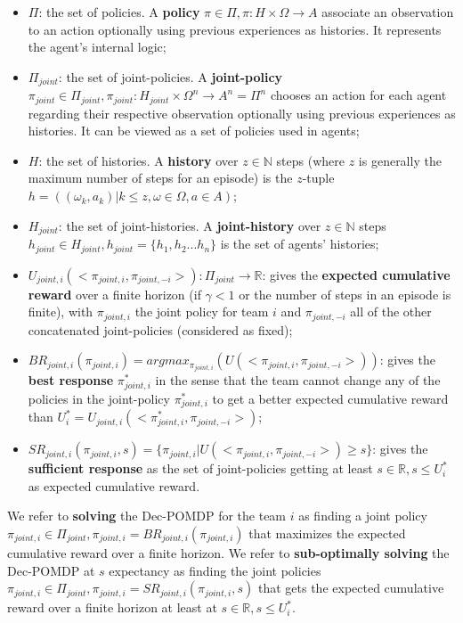 \documentclass[runningheads]{llncs}
\theoremstyle{freethm}
\theoremstyle{proofoutline}
\begin{document}
\begin{itemize}

    \item $\Pi$: the set of policies. A \textbf{policy} $\pi \in \Pi, \pi: H \times \Omega \rightarrow A$ associate an observation to an action optionally using previous experiences as histories. It represents the agent's internal logic;
    \item $\Pi_{joint}$: the set of joint-policies. A \textbf{joint-policy} $\pi_{joint} \in \Pi_{joint}, \pi_{joint}: H_{joint} \times \Omega^n \rightarrow A^n = \Pi^n$ chooses an action for each agent regarding their respective observation optionally using previous experiences as histories. It can be viewed as a set of policies used in agents;
    \item $H$: the set of histories. A \textbf{history} over $z \in \mathbb{N}$ steps (where $z$ is generally the maximum number of steps for an episode) is the $z$-tuple $h = ((\omega_{k}, a_{k}) | k \leq z, \omega \in \Omega, a \in A)$;
    \item $H_{joint}$: the set of joint-histories. A \textbf{joint-history} over $z \in \mathbb{N}$ steps $h_{joint} \in H_{joint}, h_{joint} = \{h_1,h_2...h_n\}$ is the set of agents' histories;
    \item $U_{joint,i}(<\pi_{joint,i}, \pi_{joint,-i}>): \Pi_{joint} \rightarrow \mathbb{R}$: gives the \textbf{expected cumulative reward} over a finite horizon (if $\gamma < 1$ or the number of steps in an episode is finite), with $\pi_{joint,i}$ the joint policy for team $i$ and $\pi_{joint,-i}$ all of the other concatenated joint-policies (considered as fixed);
    \item $BR_{joint,i}(\pi_{joint,i}) = argmax_{\pi_{joint,i}}(U(<\pi_{joint,i},\pi_{joint,-i}>))$: gives the \textbf{best response} $\pi_{joint,i}^*$ in the sense that the team cannot change any of the policies in the joint-policy $\pi_{joint,i}^*$ to get a better expected cumulative reward than $U_i^* = U_{joint,i}(<\pi_{joint,i}^*, \pi_{joint,-i}>)$;
    \item $SR_{joint,i}(\pi_{joint,i}, s) = \{\pi_{joint,i} | U(<\pi_{joint,i},\pi_{joint,-i}>) \geq s\}$: gives the \textbf{sufficient response} as the set of joint-policies getting at least $s \in \mathbb{R}, s \leq U_i^*$ as expected cumulative reward.
\end{itemize}

We refer to \textbf{solving} the Dec-POMDP for the team $i$ as finding a joint policy $\pi_{joint,i} \in \Pi_{joint}, \pi_{joint,i} = BR_{joint,i}(\pi_{joint,i})$ that maximizes the expected cumulative reward over a finite horizon.
We refer to \textbf{sub-optimally solving} the Dec-POMDP at $s$ expectancy as finding the joint policies $\pi_{joint,i} \in \Pi_{joint}, \pi_{joint,i} = SR_{joint,i}(\pi_{joint,i}, s)$ that gets the expected cumulative reward over a finite horizon at least at $s \in \mathbb{R}, s \leq U_i^*$.
\end{document}
